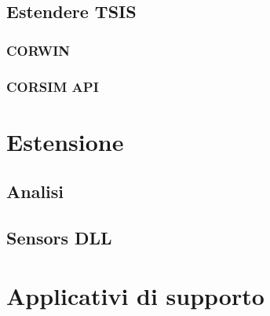 \subsection{Estendere TSIS}

\subsubsection{CORWIN}

\subsubsection{CORSIM API}

\section{Estensione}

\subsection{Analisi}

\subsection{Sensors DLL}

\section{Applicativi di supporto}
